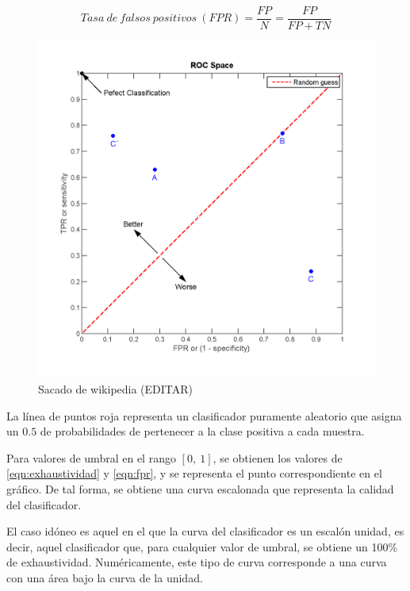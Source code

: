 \begin{equation}
	Tasa\: de\: falsos\: positivos\:(FPR) = \dfrac{FP}{N} = \dfrac{FP}{FP+TN}
	\label{eqn:fpr}
\end{equation}

\begin{figure}[h]
	\centering
	\captionsetup{justification=centering}
	\includegraphics[width=0.5\textheight]{imagenes/marco_teorico/ROC/ROC_wiki.png}	
	\caption{Sacado de wikipedia (EDITAR)}
	\label{fig:roc_curva}
\end{figure}

La línea de puntos roja representa un clasificador puramente aleatorio que asigna un $0.5$ de probabilidades de pertenecer a la clase positiva a cada muestra.

Para valores de umbral en el rango $[0,\:1]$, se obtienen los valores de \ref{eqn:exhaustividad} y \ref{eqn:fpr}, y se representa el punto correspondiente en el gráfico. De tal forma, se obtiene una curva escalonada que representa la calidad del clasificador.

El caso idóneo es aquel en el que la curva del clasificador es un escalón unidad, es decir, aquel clasificador que, para cualquier valor de umbral, se obtiene un 100\% de exhaustividad. Numéricamente, este tipo de curva corresponde a una curva con una área bajo la curva de la unidad.

